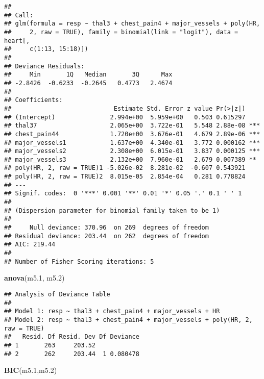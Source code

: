 \documentclass[]{article}
\newenvironment{Shaded}{\begin{snugshade}}{\end{snugshade}}
\newcommand{\KeywordTok}[1]{\textcolor[rgb]{0.13,0.29,0.53}{\textbf{#1}}}
\newcommand{\DecValTok}[1]{\textcolor[rgb]{0.00,0.00,0.81}{#1}}
\newcommand{\NormalTok}[1]{#1}
\begin{document}
\begin{verbatim}
## 
## Call:
## glm(formula = resp ~ thal3 + chest_pain4 + major_vessels + poly(HR, 
##     2, raw = TRUE), family = binomial(link = "logit"), data = heart[, 
##     c(1:13, 15:18)])
## 
## Deviance Residuals: 
##     Min       1Q   Median       3Q      Max  
## -2.8426  -0.6233  -0.2645   0.4773   2.4674  
## 
## Coefficients:
##                            Estimate Std. Error z value Pr(>|z|)    
## (Intercept)               2.994e+00  5.959e+00   0.503 0.615297    
## thal37                    2.065e+00  3.722e-01   5.548 2.88e-08 ***
## chest_pain44              1.720e+00  3.676e-01   4.679 2.89e-06 ***
## major_vessels1            1.637e+00  4.340e-01   3.772 0.000162 ***
## major_vessels2            2.308e+00  6.015e-01   3.837 0.000125 ***
## major_vessels3            2.132e+00  7.960e-01   2.679 0.007389 ** 
## poly(HR, 2, raw = TRUE)1 -5.026e-02  8.281e-02  -0.607 0.543921    
## poly(HR, 2, raw = TRUE)2  8.015e-05  2.854e-04   0.281 0.778824    
## ---
## Signif. codes:  0 '***' 0.001 '**' 0.01 '*' 0.05 '.' 0.1 ' ' 1
## 
## (Dispersion parameter for binomial family taken to be 1)
## 
##     Null deviance: 370.96  on 269  degrees of freedom
## Residual deviance: 203.44  on 262  degrees of freedom
## AIC: 219.44
## 
## Number of Fisher Scoring iterations: 5
\end{verbatim}

\begin{Shaded}
\begin{Highlighting}[]
\KeywordTok{anova}\NormalTok{(m5.}\DecValTok{1}\NormalTok{, m5.}\DecValTok{2}\NormalTok{)}
\end{Highlighting}
\end{Shaded}

\begin{verbatim}
## Analysis of Deviance Table
## 
## Model 1: resp ~ thal3 + chest_pain4 + major_vessels + HR
## Model 2: resp ~ thal3 + chest_pain4 + major_vessels + poly(HR, 2, raw = TRUE)
##   Resid. Df Resid. Dev Df Deviance
## 1       263     203.52            
## 2       262     203.44  1 0.080478
\end{verbatim}

\begin{Shaded}
\begin{Highlighting}[]
\KeywordTok{BIC}\NormalTok{(m5.}\DecValTok{1}\NormalTok{,m5.}\DecValTok{2}\NormalTok{)}
\end{Highlighting}
\end{Shaded}
\end{document}
